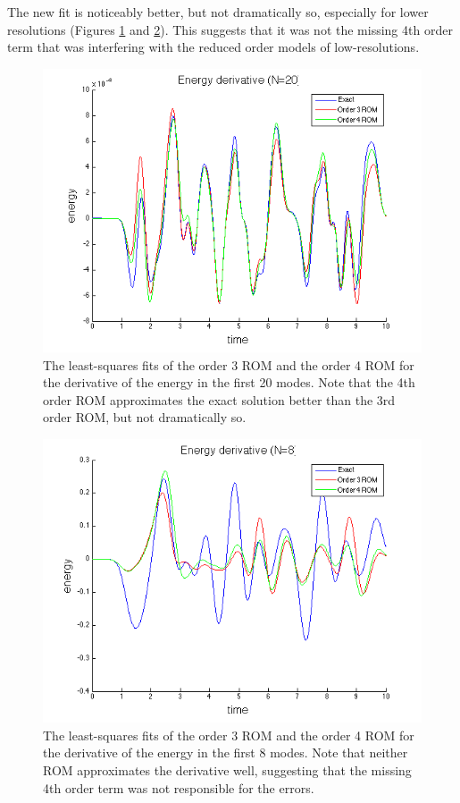 \documentclass{article}
\begin{document}
The new fit is noticeably better, but not dramatically so, especially for lower resolutions (Figures \ref{fig:least_squares_3_vs_4} and \ref{fig:least_squares_3_vs_4_8}). This suggests that it was not the missing 4th order term that was interfering with the reduced order models of low-resolutions.



\begin{figure}[h]
\includegraphics[width=\textwidth]{4th_order_fit.png}
\caption{The least-squares fits of the order 3 ROM and the order 4 ROM for the derivative of the energy in the first 20 modes. Note that the 4th order ROM approximates the exact solution better than the 3rd order ROM, but not dramatically so.}\label{fig:least_squares_3_vs_4}
\end{figure}

\begin{figure}[h]
\includegraphics[width=\textwidth]{4th_order_fit_8.png}
\caption{The least-squares fits of the order 3 ROM and the order 4 ROM for the derivative of the energy in the first 8 modes. Note that neither ROM approximates the derivative well, suggesting that the missing 4th order term was not responsible for the errors.}\label{fig:least_squares_3_vs_4_8}
\end{figure}
\end{document}
